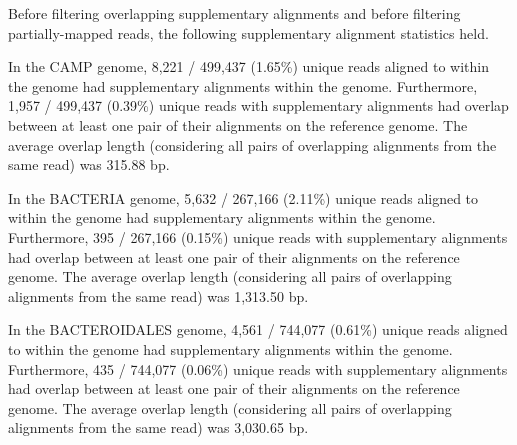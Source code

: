 Before filtering overlapping supplementary alignments and before filtering
partially-mapped reads, the following supplementary alignment statistics held.

In the CAMP genome, 8,221 / 499,437 (1.65\%) unique reads aligned to within the genome had supplementary alignments within the genome.
Furthermore, 1,957 / 499,437 (0.39\%) unique reads with supplementary alignments had overlap between at least one pair of their alignments on the reference genome.
The average overlap length (considering all pairs of overlapping alignments from the same read) was 315.88 bp.

In the BACTERIA genome, 5,632 / 267,166 (2.11\%) unique reads aligned to within the genome had supplementary alignments within the genome.
Furthermore, 395 / 267,166 (0.15\%) unique reads with supplementary alignments had overlap between at least one pair of their alignments on the reference genome.
The average overlap length (considering all pairs of overlapping alignments from the same read) was 1,313.50 bp.

In the BACTEROIDALES genome, 4,561 / 744,077 (0.61\%) unique reads aligned to within the genome had supplementary alignments within the genome.
Furthermore, 435 / 744,077 (0.06\%) unique reads with supplementary alignments had overlap between at least one pair of their alignments on the reference genome.
The average overlap length (considering all pairs of overlapping alignments from the same read) was 3,030.65 bp.
\endinput